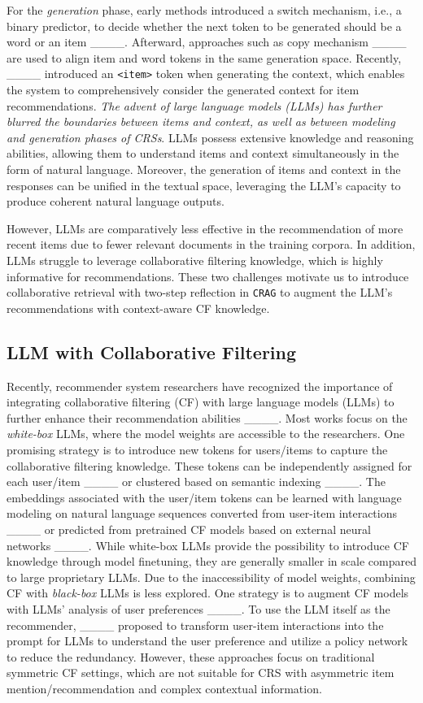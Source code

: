 For the \textit{generation} phase, early methods introduced a switch mechanism, i.e., a binary predictor, to decide whether the next token to be generated should be a word or an item ____. Afterward, approaches such as copy mechanism ____ are used to align item and word tokens in the same generation space. Recently, ____ introduced an \texttt{<item>} token when generating the context, which enables the system to comprehensively consider the generated context for item recommendations. \textit{The advent of large language models (LLMs) has further blurred the boundaries between items and context, as well as between modeling and generation phases of CRSs}. LLMs possess extensive knowledge and reasoning abilities, allowing them to understand items and context simultaneously in the form of natural language. Moreover, the generation of items and context in the responses can be unified in the textual space, leveraging the LLM's capacity to produce coherent natural language outputs.

However, LLMs are comparatively less effective in the recommendation of more recent items due to fewer relevant documents in the training corpora. In addition, LLMs struggle to leverage collaborative filtering knowledge, which is highly informative for recommendations. These two challenges motivate us to introduce collaborative retrieval with two-step reflection in \texttt{CRAG} to augment the LLM's recommendations with context-aware CF knowledge. 

\subsection{LLM with Collaborative Filtering}

Recently, recommender system researchers have recognized the importance of integrating collaborative filtering (CF) with large language models (LLMs) to further enhance their recommendation abilities ____. Most works focus on the \textit{white-box} LLMs, where the model weights are accessible to the researchers. One promising strategy is to introduce new tokens for users/items to capture the collaborative filtering knowledge. These tokens can be independently assigned for each user/item ____ or clustered based on semantic indexing ____. The embeddings associated with the user/item tokens can be learned with language modeling on natural language sequences converted from user-item interactions ____ or predicted from pretrained CF models based on external neural networks ____. While white-box LLMs provide the possibility to introduce CF knowledge through model finetuning, they are generally smaller in scale compared to large proprietary LLMs. Due to the inaccessibility of model weights, combining CF with \textit{black-box} LLMs is less explored. One strategy is to augment CF models with LLMs' analysis of user preferences ____. To use the LLM itself as the recommender, ____ proposed to transform user-item interactions into the prompt for LLMs to understand the user preference and utilize a policy network to reduce the redundancy. However, these approaches focus on traditional symmetric CF settings, which are not suitable for CRS with asymmetric item mention/recommendation and complex contextual information.

